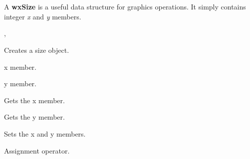 \section{}\label{wxsize}

A {\bf wxSize} is a useful data structure for graphics operations.
It simply contains integer {\it x} and {\it y} members.




, 





Creates a size object.



x member.



y member.

\label{wxsizegetx}


Gets the x member.

\label{wxsizegety}


Gets the y member.

\label{wxsizeset}


Sets the x and y members.



Assignment operator.



